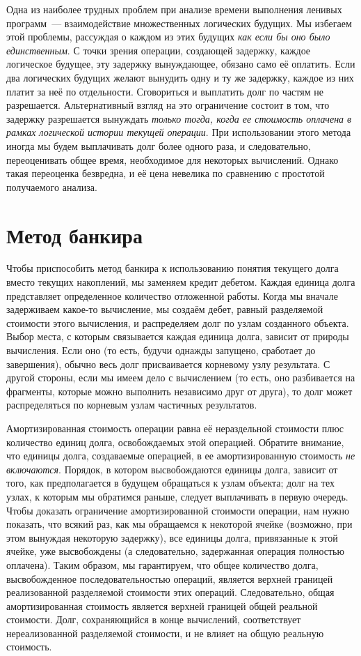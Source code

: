 Одна из наиболее трудных проблем при анализе времени выполнения
ленивых программ~--- взаимодействие множественных логических
будущих. Мы избегаем этой проблемы, рассуждая о каждом из этих будущих
\emph{как если бы оно было единственным}. С точки зрения операции,
создающей задержку, каждое логическое будущее, эту задержку
вынуждающее, обязано само её оплатить. Если два логических будущих
желают вынудить одну и ту же задержку, каждое из них платит за неё по
отдельности. Сговориться и выплатить долг по частям не
разрешается. Альтернативный взгляд на это ограничение состоит в том,
что задержку разрешается вынуждать \emph{только тогда, когда ее
  стоимость оплачена в рамках логической истории текущей операции}.
При использовании этого метода иногда мы будем выплачивать долг более
одного раза, и следовательно, переоценивать общее время, необходимое
для некоторых вычислений. Однако такая переоценка безвредна, и её цена
невелика по сравнению с простотой получаемого анализа.

\section{Метод банкира}
\label{sc:6.3}

Чтобы приспособить метод банкира к использованию понятия текущего
долга вместо текущих накоплений, мы заменяем кредит дебетом. Каждая
единица долга представляет определенное количество отложенной
работы. Когда мы вначале задерживаем какое-то вычисление, мы создаём
дебет, равный разделяемой стоимости этого вычисления, и распределяем
долг по узлам созданного объекта.  Выбор места, с которым связывается
каждая единица долга, зависит от природы вычисления. Если оно
 (то есть, будучи однажды запущено,
сработает до завершения), обычно весь долг присваивается корневому
узлу результата. С другой стороны, если мы имеем дело с
 вычислением (то есть, оно разбивается
на фрагменты, которые можно выполнить независимо друг от друга), то
долг может распределяться по корневым узлам частичных результатов.

Амортизированная стоимость операции равна её нераздельной стоимости
плюс количество единиц долга, освобождаемых этой операцией. Обратите
внимание, что единицы долга, создаваемые операцией, в ее
амортизированную стоимость \emph{не включаются}. Порядок, в котором
высвобождаются единицы долга, зависит от того, как предполагается в
будущем обращаться к узлам объекта; долг на тех узлах, к которым мы
обратимся раньше, следует выплачивать в первую очередь. Чтобы
доказать ограничение амортизированной стоимости операции, нам нужно
показать, что всякий раз, как мы обращаемся к некоторой ячейке
(возможно, при этом вынуждая некоторую задержку), все единицы долга,
привязанные к этой ячейке, уже высвобождены (а следовательно,
задержанная операция полностью оплачена). Таким образом, мы
гарантируем, что общее количество долга, высвобожденное
последовательностью операций, является верхней границей реализованной
разделяемой стоимости этих операций. Следовательно, общая
амортизированная стоимость является верхней границей общей реальной
стоимости. Долг, сохраняющийся в конце вычислений, соответствует
нереализованной разделяемой стоимости, и не влияет на общую реальную
стоимость.

